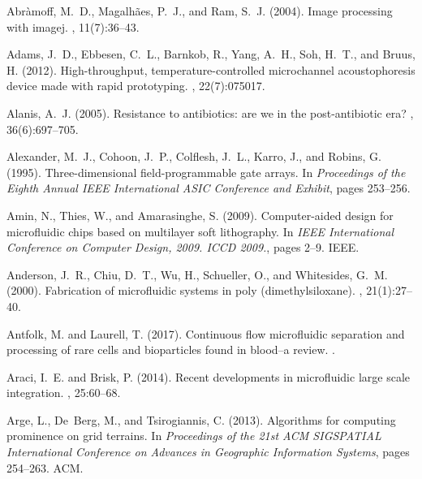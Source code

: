 \documentclass[12pt,letterpaper]{report}          %
\begin{document}
\begin{thebibliography}{}

Abr{\`a}moff, M.~D., Magalh{\~a}es, P.~J., and Ram, S.~J. (2004).
\newblock Image processing with imagej.
, 11(7):36--43.

Adams, J.~D., Ebbesen, C.~L., Barnkob, R., Yang, A.~H., Soh, H.~T., and Bruus,
  H. (2012).
\newblock High-throughput, temperature-controlled microchannel acoustophoresis
  device made with rapid prototyping.
, 22(7):075017.

Alanis, A.~J. (2005).
\newblock Resistance to antibiotics: are we in the post-antibiotic era?
, 36(6):697--705.

Alexander, M.~J., Cohoon, J.~P., Colflesh, J.~L., Karro, J., and Robins, G.
  (1995).
\newblock Three-dimensional field-programmable gate arrays.
\newblock In {\em Proceedings of the Eighth Annual IEEE International ASIC
  Conference and Exhibit}, pages 253--256.

Amin, N., Thies, W., and Amarasinghe, S. (2009).
\newblock Computer-aided design for microfluidic chips based on multilayer soft
  lithography.
\newblock In {\em IEEE International Conference on Computer Design, 2009. ICCD
  2009.}, pages 2--9. IEEE.

Anderson, J.~R., Chiu, D.~T., Wu, H., Schueller, O., and Whitesides, G.~M.
  (2000).
\newblock Fabrication of microfluidic systems in poly (dimethylsiloxane).
, 21(1):27--40.

Antfolk, M. and Laurell, T. (2017).
\newblock Continuous flow microfluidic separation and processing of rare cells
  and bioparticles found in blood--a review.
.

Araci, I.~E. and Brisk, P. (2014).
\newblock Recent developments in microfluidic large scale integration.
, 25:60--68.

Arge, L., De~Berg, M., and Tsirogiannis, C. (2013).
\newblock Algorithms for computing prominence on grid terrains.
\newblock In {\em Proceedings of the 21st ACM SIGSPATIAL International
  Conference on Advances in Geographic Information Systems}, pages 254--263.
  ACM.


\end{thebibliography}
\end{document}
